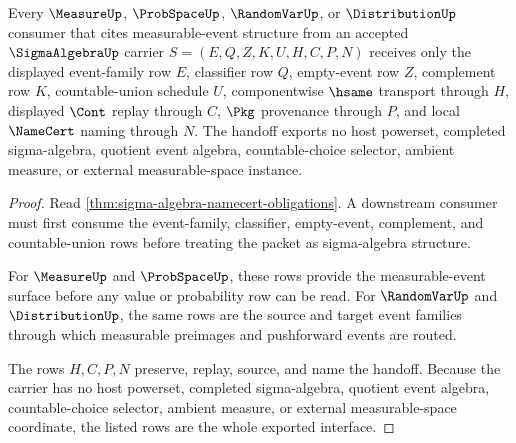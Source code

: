 \begin{theorem}
\label{thm:sigma-algebra-measure-handoff}
Every $\MeasureUp$, $\ProbSpaceUp$, $\RandomVarUp$, or $\DistributionUp$ consumer that cites measurable-event structure from an accepted $\SigmaAlgebraUp$ carrier $S=(E,Q,Z,K,U,H,C,P,N)$ receives only the displayed event-family row $E$, classifier row $Q$, empty-event row $Z$, complement row $K$, countable-union schedule $U$, componentwise $\hsame$ transport through $H$, displayed $\Cont$ replay through $C$, $\Pkg$ provenance through $P$, and local $\NameCert$ naming through $N$. The handoff exports no host powerset, completed sigma-algebra, quotient event algebra, countable-choice selector, ambient measure, or external measurable-space instance.
\end{theorem}
\begin{proof}
Read \autoref{thm:sigma-algebra-namecert-obligations}. A downstream consumer must first consume the event-family, classifier, empty-event, complement, and countable-union rows before treating the packet as sigma-algebra structure.

For $\MeasureUp$ and $\ProbSpaceUp$, these rows provide the measurable-event surface before any value or probability row can be read. For $\RandomVarUp$ and $\DistributionUp$, the same rows are the source and target event families through which measurable preimages and pushforward events are routed.

The rows $H,C,P,N$ preserve, replay, source, and name the handoff. Because the carrier has no host powerset, completed sigma-algebra, quotient event algebra, countable-choice selector, ambient measure, or external measurable-space coordinate, the listed rows are the whole exported interface.
\end{proof}


\begin{closurestatus}{\SigmaAlgebraUp}
  \theoryclosure{\seedClosure}
  \formalstatus{\unformalizedV}
\end{closurestatus}
